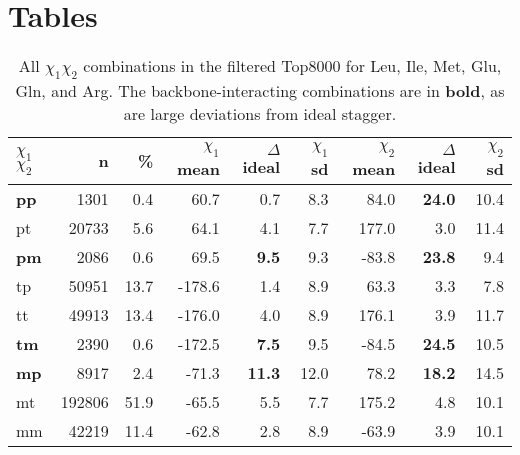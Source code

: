 \section{Tables}

\begin{table}[h]
\begin{center}
\begin{tabular}{l r r r r r r r r}
\toprule
$\chi_{1}$$\chi_{2}$ & n      & \% & $\chi_{1}$ mean& $\Delta$ ideal& $\chi_{1}$ sd&$\chi_{2}$ mean&$\Delta$ ideal&$\chi_{2}$ sd  \\ \toprule
\textbf{pp}    & 1301   & 0.4    & 60.7     & 0.7   & 8.3     & 84.0     &\textbf{24.0} & 10.4 \\
        pt     & 20733  & 5.6    & 64.1     & 4.1   & 7.7     & 177.0    & 3.0  & 11.4 \\
\textbf{pm}    & 2086   & 0.6    & 69.5     &\textbf{9.5}& 9.3& -83.8    &\textbf{23.8}& 9.4 \\
        tp     & 50951  & 13.7   & -178.6   & 1.4   & 8.9     & 63.3     & 3.3  & 7.8 \\
        tt     & 49913  & 13.4   & -176.0   & 4.0   & 8.9     & 176.1    & 3.9  & 11.7 \\
\textbf{tm}    & 2390   & 0.6    & -172.5   &\textbf{7.5}& 9.5& -84.5    &\textbf{24.5}& 10.5 \\
\textbf{mp}    & 8917   & 2.4    & -71.3    &\textbf{11.3}&12.0&78.2&\textbf{18.2}& 14.5 \\
        mt     & 192806 & 51.9   & -65.5    & 5.5   & 7.7     & 175.2    & 4.8  & 10.1 \\
        mm     & 42219  & 11.4   & -62.8    & 2.8   & 8.9     & -63.9    & 3.9  & 10.1 \\

\end{tabular}
\end{center}
\vspace{-12pt}
\caption{All $\chi_{1}$$\chi_{2}$ combinations in the filtered Top8000 for Leu, Ile, Met, Glu, Gln, and Arg. The backbone-interacting combinations are in \textbf{bold}, as are large deviations from ideal stagger.}
\label{tab:chi12}
\end{table}%

\bigskip



